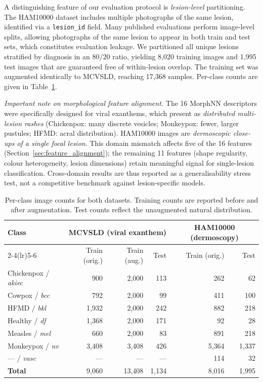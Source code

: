 \documentclass[preprint,12pt]{elsarticle}
\begin{document}
A distinguishing feature of our evaluation protocol is
\emph{lesion-level} partitioning.  The HAM10000 dataset includes
multiple photographs of the same lesion, identified via a
\texttt{lesion\_id} field.  Many published evaluations perform
image-level splits, allowing photographs of the same lesion to appear
in both train and test sets, which constitutes evaluation leakage.
We partitioned all unique lesions stratified by diagnosis in an
$80/20$ ratio, yielding 8,020 training images and 1,995 test images
that are guaranteed free of within-lesion overlap.  The training set
was augmented identically to MCVSLD, reaching 17,368 samples.
Per-class counts are given in Table~\ref{tab:dataset}.

\textit{Important note on morphological feature alignment.}
The 16 MorphNN descriptors were specifically designed for viral
exanthems, which present as \emph{distributed multi-lesion rashes}
(Chickenpox: many discrete vesicles; Monkeypox: fewer, larger
pustules; HFMD: acral distribution).  HAM10000 images are
\emph{dermoscopic close-ups of a single focal lesion}.  This
domain mismatch affects five of the 16 features
(Section~\ref{sec:feature_alignment}); the remaining 11 features
(shape regularity, colour heterogeneity, lesion dimensions) retain
meaningful signal for single-lesion classification.  Cross-domain
results are thus reported as a generalisability stress test, not a
competitive benchmark against lesion-specific models.

\begin{table}[htbp]
\centering
\caption{Per-class image counts for both datasets.
  Training counts are reported before and after augmentation.
  Test counts reflect the unaugmented natural distribution.}
\label{tab:dataset}
\setlength{\tabcolsep}{5pt}
\begin{tabular}{lrrr|rr}
\toprule
\multirow{2}{*}{\textbf{Class}} &
  \multicolumn{3}{c|}{\textbf{MCVSLD (viral exanthem)}} &
  \multicolumn{2}{c}{\textbf{HAM10000 (dermoscopy)}} \\
\cmidrule(lr){2-4}\cmidrule(lr){5-6}
 & Train (orig.) & Train (aug.) & Test &
   Train (orig.) & Test \\
\midrule
Chickenpox / \textit{akiec} & 900    & 2{,}000 & 113 & 262  & 62   \\
Cowpox / \textit{bcc}       & 792    & 2{,}000 & 99  & 411  & 100  \\
HFMD / \textit{bkl}         & 1{,}932 & 2{,}000 & 242 & 882  & 218  \\
Healthy / \textit{df}       & 1{,}368 & 2{,}000 & 171 & 92   & 28   \\
Measles / \textit{mel}      & 660    & 2{,}000 & 83  & 891  & 218  \\
Monkeypox / \textit{nv}     & 3{,}408 & 3{,}408 & 426 & 5{,}364 & 1{,}337 \\
{---} / \textit{vasc}       & ---    & ---     & --- & 114  & 32   \\
\midrule
\textbf{Total}              & 9{,}060 & 13{,}408 & 1{,}134 & 8{,}016 & 1{,}995\\
\bottomrule
\end{tabular}
\end{table}
\end{document}

